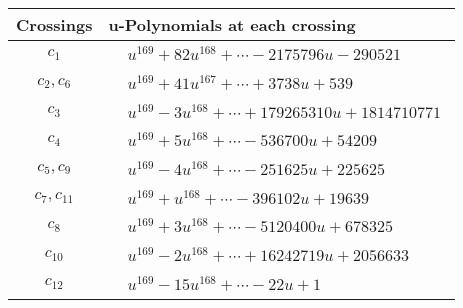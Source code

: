 \documentclass[1p]{elsarticle_modified}
\theoremstyle{definition}
\begin{document}
\begin{tabular}{m{50pt}|m{274pt}}
Crossings & \hspace{64pt}u-Polynomials at each crossing \\
\hline $$\begin{aligned}c_{1}\end{aligned}$$&$\begin{aligned}
&u^{169}+82 u^{168}+\cdots-2175796 u-290521
\end{aligned}$\\
\hline $$\begin{aligned}c_{2},c_{6}\end{aligned}$$&$\begin{aligned}
&u^{169}+41 u^{167}+\cdots+3738 u+539
\end{aligned}$\\
\hline $$\begin{aligned}c_{3}\end{aligned}$$&$\begin{aligned}
&u^{169}-3 u^{168}+\cdots+179265310 u+1814710771
\end{aligned}$\\
\hline $$\begin{aligned}c_{4}\end{aligned}$$&$\begin{aligned}
&u^{169}+5 u^{168}+\cdots-536700 u+54209
\end{aligned}$\\
\hline $$\begin{aligned}c_{5},c_{9}\end{aligned}$$&$\begin{aligned}
&u^{169}-4 u^{168}+\cdots-251625 u+225625
\end{aligned}$\\
\hline $$\begin{aligned}c_{7},c_{11}\end{aligned}$$&$\begin{aligned}
&u^{169}+u^{168}+\cdots-396102 u+19639
\end{aligned}$\\
\hline $$\begin{aligned}c_{8}\end{aligned}$$&$\begin{aligned}
&u^{169}+3 u^{168}+\cdots-5120400 u+678325
\end{aligned}$\\
\hline $$\begin{aligned}c_{10}\end{aligned}$$&$\begin{aligned}
&u^{169}-2 u^{168}+\cdots+16242719 u+2056633
\end{aligned}$\\
\hline $$\begin{aligned}c_{12}\end{aligned}$$&$\begin{aligned}
&u^{169}-15 u^{168}+\cdots-22 u+1
\end{aligned}$\\
\hline
\end{tabular}\\~\\
\end{document}
